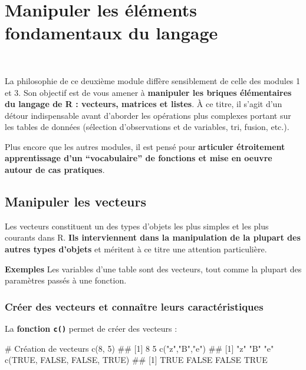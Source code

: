 \documentclass[12pt,twosided, notitlepage]{book}
\newenvironment{Shaded}{}{}
\newcommand{\KeywordTok}[1]{\textcolor[rgb]{0.00,0.00,1.00}{{#1}}}
\newcommand{\DecValTok}[1]{{#1}}
\newcommand{\StringTok}[1]{\textcolor[rgb]{0.00,0.50,0.50}{{#1}}}
\newcommand{\CommentTok}[1]{\textcolor[rgb]{0.00,0.50,0.00}{{#1}}}
\newcommand{\OtherTok}[1]{\textcolor[rgb]{1.00,0.25,0.00}{{#1}}}
\newcommand{\NormalTok}[1]{{#1}}
\renewenvironment{Shaded}{\begin{snugshade}}{\end{snugshade}}
\begin{document}
\chapter{Manipuler les éléments fondamentaux du langage}

\minitoc 

~

La philosophie de ce deuxième module diffère sensiblement de celle des
modules 1 et 3. Son objectif est de vous amener à \textbf{manipuler les
briques élémentaires du langage de R : vecteurs, matrices et listes}. À
ce titre, il s'agit d'un détour indispensable avant d'aborder les
opérations plus complexes portant sur les tables de données (sélection
d'observations et de variables, tri, fusion, etc.).

Plus encore que les autres modules, il est pensé pour \textbf{articuler
étroitement apprentissage d'un \enquote{vocabulaire} de fonctions et
mise en oeuvre autour de cas pratiques}.

\section{Manipuler les vecteurs}\label{manipuler-les-vecteurs}

Les vecteurs constituent un des types d'objets les plus simples et les
plus courants dans R. \textbf{Ils interviennent dans la manipulation de
la plupart des autres types d'objets} et méritent à ce titre une
attention particulière.

\textbf{Exemples} Les variables d'une table sont des vecteurs, tout
comme la plupart des paramètres passés à une fonction.

\subsection{Créer des vecteurs et connaître leurs
caractéristiques}\label{creer-des-vecteurs-et-connaitre-leurs-caracteristiques}

La \textbf{fonction \texttt{c()}} permet de
créer des vecteurs :

\begin{Shaded}
\begin{Highlighting}[]
\CommentTok{# Création de vecteurs}
\KeywordTok{c}\NormalTok{(}\DecValTok{8}\NormalTok{, }\DecValTok{5}\NormalTok{)}
  \NormalTok{## [1] 8 5}
\KeywordTok{c}\NormalTok{(}\StringTok{"z"}\NormalTok{,}\StringTok{"B"}\NormalTok{,}\StringTok{"e"}\NormalTok{)}
  \NormalTok{## [1] "z" "B" "e"}
\KeywordTok{c}\NormalTok{(}\OtherTok{TRUE}\NormalTok{, }\OtherTok{FALSE}\NormalTok{, }\OtherTok{FALSE}\NormalTok{, }\OtherTok{TRUE}\NormalTok{)}
  \NormalTok{## [1]  TRUE FALSE FALSE  TRUE}
\end{Highlighting}
\end{Shaded}
\end{document}
